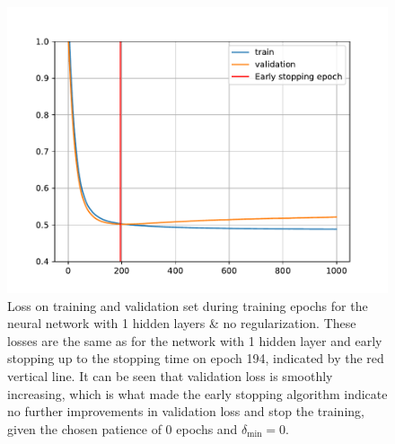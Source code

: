 \begin{figure}
    \centering
    \includegraphics{pics/figure_Credit_NN_1hidden_noreg_loss.pdf}
    \caption{Loss on training and validation set during training epochs for the neural network with 1 hidden layers \& no regularization. These losses are the same as for the network with 1 hidden layer and early stopping up to the stopping time on epoch 194, indicated by the red vertical line. It can be seen that validation loss is smoothly increasing, which is what made the early stopping algorithm indicate no further improvements in validation loss and stop the training, given the chosen patience of 0 epochs and $\delta_{\text{min}} = 0$.}
    \label{fig:Credit_NN_1hidden_noreg_loss}
\end{figure}
\clearpage
